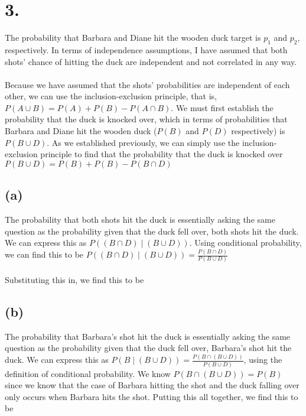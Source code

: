 \documentclass{article}
\begin{document}
\section*{3.}
{\Large 
The probability that Barbara and Diane hit the wooden duck target is $p_1$ and $p_2$, respectively. 
In terms of independence assumptions, I have assumed that both shots' chance of hitting the duck are independent and not correlated in any way. \\ \\ 
Because we have assumed that the shots' probabilities are independent of each other, we can use the inclusion-exclusion principle, that is, $P(A \cup B) = P(A) + P(B) - P(A \cap B)$. We must first establish the probability that the duck is knocked over, which in terms of probabilities that Barbara and Diane hit the wooden duck ($P(B)$ and $P(D)$ respectively) is $P(B \cup D)$. As we established previously, we can simply use the inclusion-exclusion principle to find that the probability that the duck is knocked over $P(B \cup D) = P(B) + P(B) - P(B \cap D)$

\subsection*{(a)}
The probability that both shots hit the duck is essentially asking the same question as the probability given that the duck fell over, both shots hit the duck. We can express this as $P((B \cap D) \mid (B \cup D))$. Using conditional probability, we can find this to be $P((B \cap D) \mid (B \cup D)) = \frac{P(B \cap D)}{P(B \cup D)}$ \\ \\ Substituting this in, we find this to be 

\subsection*{(b)}
The probability that Barbara's shot hit the duck is essentially asking the same question as the probability given that the duck fell over, Barbara's shot hit the duck. We can express this as $P(B \mid (B \cup D)) = \frac{P(B \cap (B \cup D))}{P(B \cup D)}$, using the definition of conditional probability. We know $P(B \cap (B \cup D)) = P(B)$ since we know that the case of Barbara hitting the shot and the duck falling over only occurs when Barbara hits the shot. Putting this all together, we find this to be 

}
\end{document}
